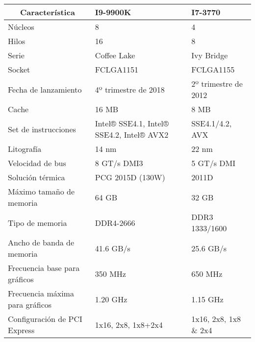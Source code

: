 \begin{tabular}{|p{5.6cm}|p{4cm}|p{4cm}|}
  \hline
  \multicolumn{1}{|c|}{\textbf{Característica}} & \textbf{I9-9900K} & \textbf{I7-3770} \\ \hline
  Núcleos & 8 & 4 \\ \hline
  Hilos & 16 & 8 \\ \hline
  Serie & Coffee Lake & Ivy Bridge \\ \hline
  Socket & FCLGA1151 & FCLGA1155 \\ \hline
  Fecha de lanzamiento & 4º trimestre de 2018 & 2º trimestre de 2012 \\ \hline
  Cache & 16 MB & 8 MB \\ \hline
  Set de instrucciones & Intel® SSE4.1, Intel® SSE4.2, Intel® AVX2 & SSE4.1/4.2, AVX \\ \hline
  Litografía & 14 nm & 22 nm \\ \hline
  Velocidad de bus & 8 GT/s DMI3 & 5 GT/s DMI \\ \hline
  Solución térmica & PCG 2015D (130W) & 2011D \\ \hline
  Máximo tamaño de memoria & 64 GB & 32 GB \\ \hline
  Tipo de memoria & DDR4-2666 & DDR3 1333/1600 \\ \hline
  Ancho de banda de memoria & 41.6 GB/s & 25.6 GB/s \\ \hline
  Frecuencia base para gráficos & 350 MHz & 650 MHz \\ \hline
  Frecuencia máxima para gráficos & 1.20 GHz & 1.15 GHz \\ \hline
  Configuración de PCI Express & 1x16, 2x8, 1x8+2x4 & 1x16, 2x8, 1x8 \& 2x4 \\ \hline
\end{tabular}